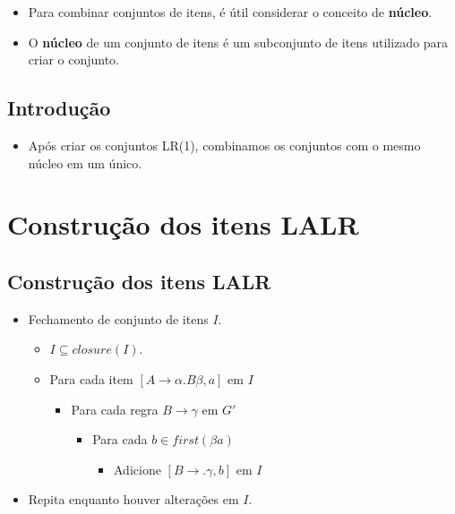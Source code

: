 \documentclass[11pt]{article}
\begin{document}
\begin{itemize}
\item Para combinar conjuntos de itens, é útil considerar o conceito de \textbf{núcleo}.

\item O \textbf{núcleo} de um conjunto de itens é um subconjunto de itens utilizado para criar o conjunto.
\end{itemize}
\subsection*{Introdução}
\label{sec:orgaca6bee}

\begin{itemize}
\item Após criar os conjuntos LR(1), combinamos os conjuntos com o mesmo núcleo em um único.
\end{itemize}
\section*{Construção dos itens LALR}
\label{sec:org406f11d}

\subsection*{Construção dos itens LALR}
\label{sec:org2edec9e}

\begin{itemize}
\item Fechamento de conjunto de itens \(I\).
\begin{itemize}
\item \(I\subseteq closure(I)\).
\item Para cada item \([A\to \alpha \textbf{.}B\beta,a]\) em \(I\)
\begin{itemize}
\item Para cada regra \(B \to \gamma\) em \(G'\)
\begin{itemize}
\item Para cada \(b\in first(\beta a)\)
\begin{itemize}
\item Adicione \([B \to .\gamma,b]\) em \(I\)
\end{itemize}
\end{itemize}
\end{itemize}
\end{itemize}
\item Repita enquanto houver alterações em \(I\).
\end{itemize}
\end{document}

